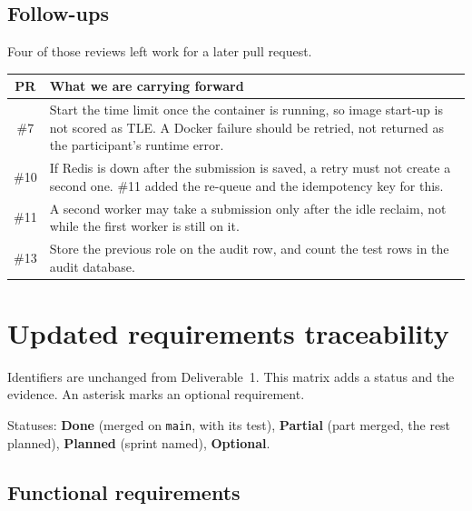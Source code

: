 \documentclass[11pt,a4paper]{article}
\begin{document}
\subsection{Follow-ups}
\label{sec:findings}

Four of those reviews left work for a later pull request.

\begin{center}
\small
\begin{tabularx}{\textwidth}{@{}c Y@{}}
\toprule
{} PR & What we are carrying forward \\
\midrule
\#7 & Start the time limit once the container is running, so image start-up is not scored as TLE. A Docker failure should be retried, not returned as the participant's runtime error. \\
\#10 & If Redis is down after the submission is saved, a retry must not create a second one. \#11 added the re-queue and the idempotency key for this. \\
\#11 & A second worker may take a submission only after the idle reclaim, not while the first worker is still on it. \\
\#13 & Store the previous role on the audit row, and count the test rows in the audit database. \\
\bottomrule
\end{tabularx}
\end{center}

\section{Updated requirements traceability}

Identifiers are unchanged from Deliverable~1. This matrix adds a status and the evidence. An asterisk marks an optional requirement.

Statuses: \textbf{Done} (merged on \texttt{main}, with its test), \textbf{Partial} (part merged, the rest planned), \textbf{Planned} (sprint named), \textbf{Optional}.

\subsection{Functional requirements}
\end{document}
